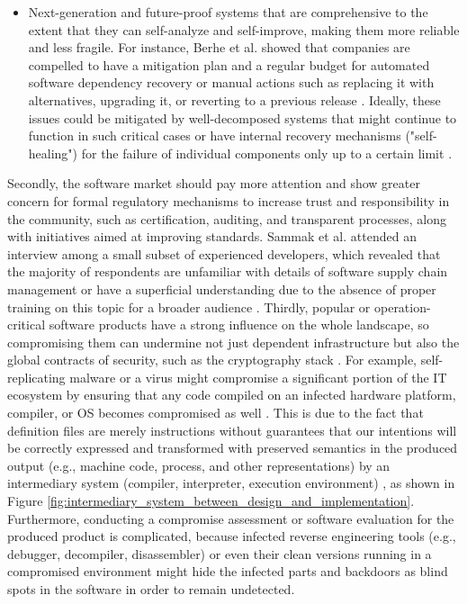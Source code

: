 \begin{itemize}
    \item Next-generation and future-proof systems that are comprehensive to the extent that they can self-analyze and self-improve, making them more reliable and less fragile. For instance, Berhe et al. showed that companies are compelled to have a mitigation plan and a regular budget for automated software dependency recovery or manual actions such as replacing it with alternatives, upgrading it, or reverting to a previous release \cite{berhe2023maintenance}. Ideally, these issues could be mitigated by well-decomposed systems that might continue to function in such critical cases or have internal recovery mechanisms ("self-healing") for the failure of individual components only up to a certain limit \cite{dehraj2021review}.
\end{itemize}

Secondly, the software market should pay more attention and show greater concern for formal regulatory mechanisms to increase trust and responsibility in the community, such as certification, auditing, and transparent processes, along with initiatives aimed at improving standards. Sammak et al. attended an interview among a small subset of experienced developers, which revealed that the majority of respondents are unfamiliar with details of software supply chain management or have a superficial understanding due to the absence of proper training on this topic for a broader audience \cite{sammak2023developers}. Thirdly, popular or operation-critical software products have a strong influence on the whole landscape, so compromising them can undermine not just dependent infrastructure but also the global contracts of security, such as the cryptography stack \cite{tsoupidi2025protecting}. For example, self-replicating malware or a virus might compromise a significant portion of the IT ecosystem by ensuring that any code compiled on an infected hardware platform, compiler, or OS becomes compromised as well \cite{ladisa2022taxonomy}. This is due to the fact that definition files are merely instructions without guarantees that our intentions will be correctly expressed and transformed with preserved semantics in the produced output (e.g., machine code, process, and other representations) by an intermediary system (compiler, interpreter, execution environment) \cite{gottschlich2018three}, as shown in Figure \ref{fig:intermediary_system_between_design_and_implementation}. Furthermore, conducting a compromise assessment or software evaluation for the produced product is complicated, because infected reverse engineering tools (e.g., debugger, decompiler, disassembler) or even their clean versions running in a compromised environment might hide the infected parts and backdoors as blind spots in the software in order to remain undetected.

